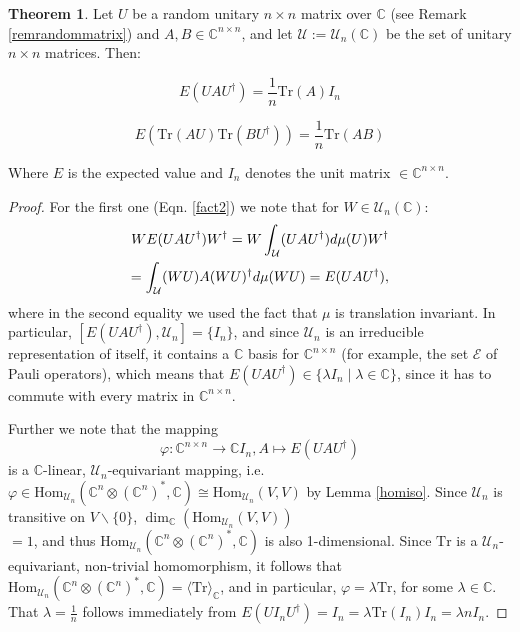 \documentclass[12pt,a4paper,BCOR15mm,twoside,DIV12]{article}
\def\E{\mathcal{E}}
\def\C{\mathbb{C}}
\def\U{\mathcal{U}}
\def\Hom{\text{Hom}}
\def\Tr{\text{Tr}}
\theoremstyle{definition}
\newtheorem{theorem}[Satz]{Theorem}
\begin{document}
\begin{theorem}
Let $U$ be a random unitary $n \times n$ matrix over $\C$ (see Remark \ref{remrandommatrix}) and $A,B \in \C^{n \times n}$, and let $\U := \U_n(\C)$ be the set of unitary $n \times n$ matrices. Then:

\begin{equation}\label{fact2} %
E(UAU^\dagger) = \frac{1}{n} \Tr(A) I_n
\end{equation}

\begin{equation}\label{fact1}
 E(\Tr(AU)\Tr(BU^\dagger)) = \frac{1}{n} \Tr(AB)
\end{equation}

Where $E$ is the expected value and $I_n$ denotes the unit matrix $\in \C^{n \times n}$.

\begin{proof}

For the first one (Eqn. \ref{fact2}) we note that $\text{for }W \in \U_n(\C):$
 \begin{align}  W E(UAU^{\dagger}) W^\dagger = W \int_{\U} ( U A  U^\dagger) d \mu (U) W^\dagger \notag \\ = \int_{\U} (WU) A (WU)^\dagger d \mu (WU) = E(UAU^\dagger), \end{align}
 where in the second equality we used the fact that $\mu$ is translation invariant.
In particular, $[E(UAU^\dagger), \U_n] = \{ I_n \}$, and since $\U_n$ is an irreducible representation of itself, it contains a $\C$ basis for $\C^{n \times n}$ (for example, the set $\E$ of Pauli operators), which means that $E(UAU^\dagger) \in \{ \lambda I_n \mid \lambda \in \C \}$, since it has to commute with every matrix in $\C^{n \times n}$.

Further we note that the mapping \[ \varphi: \C^{n \times n} \rightarrow \C I_n, A \mapsto E(UAU^\dagger) \] is a $\C$-linear, $\U_n$-equivariant mapping, i.e. $\varphi \in \Hom_{\U_n}(\C^n \otimes (\C^n)^*, \C) \cong \Hom_{\U_n}(V,V)$ by Lemma \ref{homiso}. Since $\U_n$ is transitive on $V \backslash \{ 0 \}$, $\dim_\C (\Hom_{\U_n}(V,V))$ \\$ = 1$, and thus $\Hom_{\U_n}(\C^n \otimes (\C^n)^*, \C)$ is also 1-dimensional.
Since $\Tr$ is a $\U_n$-equivariant, non-trivial homomorphism, it follows that \\$\Hom_{\U_n}(\C^n \otimes (\C^n)^*, \C) = \langle \Tr \rangle_\C$, and in particular, $\varphi = \lambda \Tr$, for some $\lambda \in \C$. That $\lambda = \frac 1 n$ follows immediately from $E(U I_n U^\dagger) = I_n = \lambda \Tr(I_n) I_n = \lambda n I_n$.


\end{proof}
\end{theorem}
\end{document}
